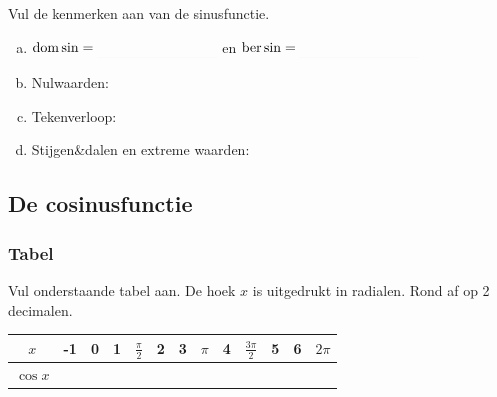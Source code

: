 \documentclass[a4paper,12pt,twoside]{article}
\begin{document}
\begin{oefening}
Vul de kenmerken aan van de sinusfunctie.
\begin{enumerate}[(a)]
  \item $\dom \sin=\arule{3cm}$ en $\ber \sin=\arule{3cm}$
  \item Nulwaarden:
  \item Tekenverloop:
  \begin{center}
    \visgraad{10cm}
  \end{center}
  \item Stijgen\&dalen en extreme waarden:
  \begin{center}
    \visgraad{10cm}
  \end{center}
\end{enumerate}
\end{oefening}

\subsection{De cosinusfunctie}
\subsubsection*{Tabel}
Vul onderstaande tabel aan. De hoek $x$ is uitgedrukt in radialen. Rond af op 2 decimalen.

\begin{adjustwidth}{-2.5cm}{-2.5cm}
\begin{center}
  \begin{tabular}{c|c|c|c|c|c|c|c|c|c|c|c|c}
    $x$ & -1 & 0 & 1 &  $\frac{\pi}{2}$ & 2 & 3 & $\pi$ & 4 & $\frac{3\pi}{2}$ & 5 & 6 & $2\pi$\\
    \hline
   $\cos x$ &\hspace*{0.5cm}&\hspace*{0.5cm}&\hspace*{0.5cm}&\hspace*{0.5cm}&\hspace*{0.5cm}&\hspace*{0.5cm}&\hspace*{0.5cm}&\hspace*{0.5cm}&\hspace*{0.5cm}&\hspace*{0.5cm}&\hspace*{0.5cm}&\hspace*{0.5cm}
  \end{tabular}
\end{center}
\end{adjustwidth}
\end{document}
